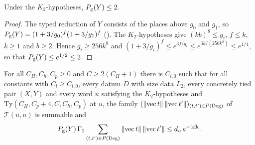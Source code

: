 \begin{lemma}\label{pf:open0:pg2}
Under the $K_2$-hypotheses, $P_{\mathrm g}(Y)\le2$.
\ 
\end{lemma}

\begin{proof}
The typed reduction of $Y$ consists of the places above $g_0$ and $g_1$, so $P_{\mathrm g}(Y)=(1+3/g_0)^f(1+3/g_1)^f$
(). The $K_2$-hypotheses give $(kb)^8\le g_i$, $f\le k$, $k\ge1$ and $b\ge2$. Hence
$g_i\ge256k^8$ and $(1+3/g_i)^f\le e^{3f/g_i}\le e^{3k/(256k^8)}\le e^{1/4}$, so that $P_{\mathrm g}(Y)\le e^{1/2}\le2$.
\end{proof}

\begin{proposition}\label{pf:open0:pairsamp}
For all $C_H,C_h,C_p\ge0$ and $C\ge2(C_H+1)$ there is $C_{l,0}$ such that for all constants with $C_l\ge C_{l,0}$, every datum $D$ with
size data $L_2$, every concretely tied pair $(X,Y)$ and every word $u$ satisfying the $K_2$-hypotheses and $\mathrm{Ty}(C_H,C_p+4,C,C_h,C_p)$
at $u$, the family $(\|\mathrm{vec}\,t\|\,\|\mathrm{vec}\,t'\|)_{(t,t')\in P(\mathrm{Deg})}$ of $\mathcal T(u,u)$ is summable and
\[
P_{\mathrm g}(Y)\,\Gamma_1\sum_{(t,t')\in P(\mathrm{Deg})}\|\mathrm{vec}\,t\|\,\|\mathrm{vec}\,t'\|\le d_u\,e^{-\operatorname{kfk}}.
\]
\ 
\end{proposition}

